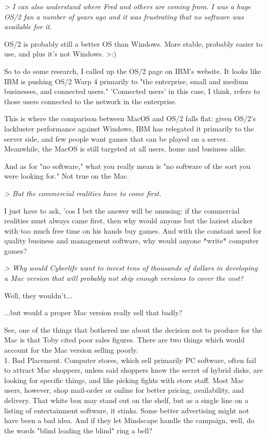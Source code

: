\documentclass[11pt,twoside,a4paper]{article}
\begin{document}
\begin{multicols*}{2}
\emph{> I can also understand where Fred and others are coming from. I was a huge OS/2 fan a number of years ago and it was frustrating that no software was available for it.}

OS/2 is probably still a better OS than Windows. More stable, probably easier to use, and plus it's not Windows. >:)

So to do some research, I called up the OS/2 page on IBM's website. It looks like IBM is pushing OS/2 Warp 4 primarily to "the enterprise, small and medium businesses, and connected users." 'Connected users' in this case, I think, refers to those users connected to the network in the enterprise.

This is where the comparison between MacOS and OS/2 falls flat: given OS/2's lackluster performance against Windows, IBM has relegated it primarily to the server side, and few people want games that can be played on a server. Meanwhile, the MacOS is still targeted at all users, home and business alike.

And as for "no software," what you really mean is "no software of the sort you were looking for." Not true on the Mac.

\emph{> But the commercial realities have to come first.}

I just have to ask, 'cos I bet the answer will be amusing: if the commercial realities must always came first, then why would anyone but the laziest slacker with too much free time on his hands buy games. And with the constant need for quality business and management software, why would anyone *write* computer games?

\emph{> Why would Cyberlife want to invest tens of thousands of dollars in developing a Mac version that will probably not ship enough versions to cover the cost?}

Well, they wouldn't...

...but would a proper Mac version really sell that badly?

See, one of the things that bothered me about the decision not to produce for the Mac is that Toby cited poor sales figures. There are two things which would account for the Mac version selling poorly.~\\

1. Bad Placement. Computer stores, which sell primarily PC software, often fail to attract Mac shoppers, unless said shoppers know the secret of hybrid disks, are looking for specific things, and like picking fights with store staff. Most Mac users, however, shop mail-order or online for better pricing, availability, and delivery. That white box may stand out on the shelf, but as a single line on a listing of entertainment software, it stinks. Some better advertising might not have been a bad idea. And if they let Mindscape handle the campaign, well, do the words "blind leading the blind" ring a bell?~\\


\end{multicols*}
\end{document}
